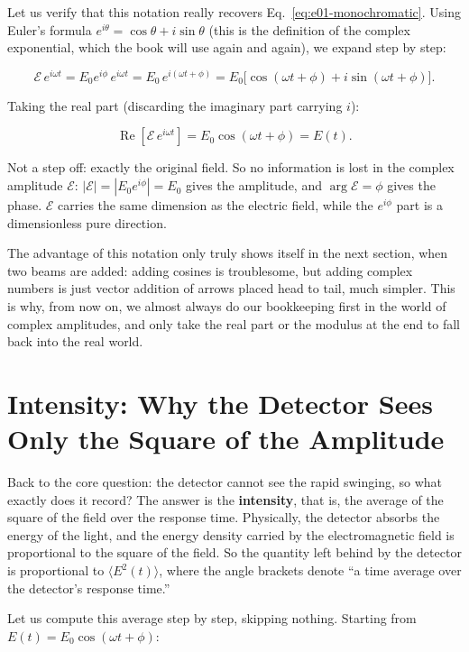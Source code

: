 Let us verify that this notation really recovers Eq.~\eqref{eq:e01-monochromatic}. Using Euler's formula \(e^{i\theta}=\cos\theta+i\sin\theta\) (this is the definition of the complex exponential, which the book will use again and again), we expand step by step:

\[
  \mathcal{E}\,e^{i\omega t}
  =E_0e^{i\phi}\,e^{i\omega t}
  =E_0\,e^{i(\omega t+\phi)}
  =E_0\bigl[\cos(\omega t+\phi)+i\sin(\omega t+\phi)\bigr].
\]

Taking the real part (discarding the imaginary part carrying \(i\)):

\[
  \operatorname{Re}\!\left[\mathcal{E}\,e^{i\omega t}\right]
  =E_0\cos(\omega t+\phi)=E(t).
\]

Not a step off: exactly the original field. So no information is lost in the complex amplitude \(\mathcal E\): \(|\mathcal E|=|E_0e^{i\phi}|=E_0\) gives the amplitude, and \(\arg\mathcal E=\phi\) gives the phase. \(\mathcal E\) carries the same dimension as the electric field, while the \(e^{i\phi}\) part is a dimensionless pure direction.

The advantage of this notation only truly shows itself in the next section, when two beams are added: adding cosines is troublesome, but adding complex numbers is just vector addition of arrows placed head to tail, much simpler. This is why, from now on, we almost always do our bookkeeping first in the world of complex amplitudes, and only take the real part or the modulus at the end to fall back into the real world.

\section{Intensity: Why the Detector Sees Only the Square of the Amplitude}
\label{sec:e01-intensity}

Back to the core question: the detector cannot see the rapid swinging, so what exactly does it record? The answer is the \textbf{intensity}, that is, the average of the square of the field over the response time. Physically, the detector absorbs the energy of the light, and the energy density carried by the electromagnetic field is proportional to the square of the field. So the quantity left behind by the detector is proportional to \(\langle E^2(t)\rangle\), where the angle brackets denote ``a time average over the detector's response time.''

Let us compute this average step by step, skipping nothing. Starting from \(E(t)=E_0\cos(\omega t+\phi)\):

